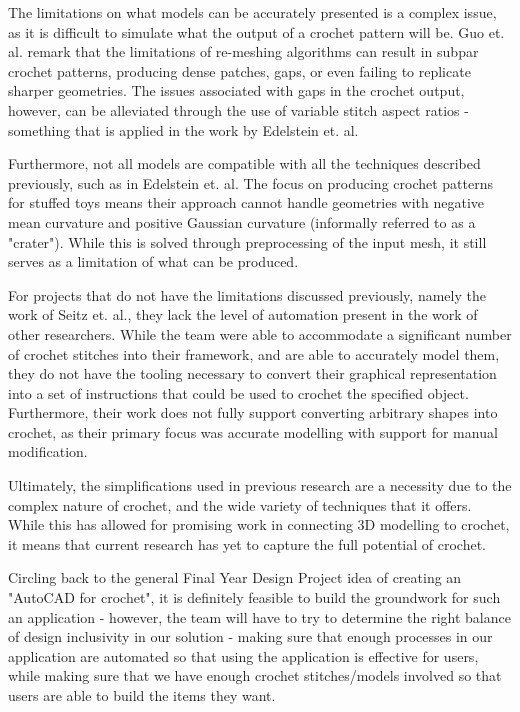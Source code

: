 \documentclass{IEEEcsmag}
\begin{document}
The limitations on what models can be accurately presented is a complex issue, as it is difficult to simulate what the output of a crochet pattern will be. Guo et. al. remark that the limitations of re-meshing algorithms can result in subpar crochet patterns, producing dense patches, gaps, or even failing to replicate sharper geometries. The issues associated with gaps in the crochet output, however, can be alleviated through the use of variable stitch aspect ratios - something that is applied in the work by Edelstein et. al. 

Furthermore, not all models are compatible with all the techniques described previously, such as in Edelstein et. al. The focus on producing crochet patterns for stuffed toys means their approach cannot handle geometries with negative mean curvature and positive Gaussian curvature (informally referred to as a "crater"). While this is solved through preprocessing of the input mesh, it still serves as a limitation of what can be produced. 

For projects that do not have the limitations discussed previously, namely the work of Seitz et. al., they lack the level of automation present in the work of other researchers. While the team were able to accommodate a significant number of crochet stitches into their framework, and are able to accurately model them, they do not have the tooling necessary to convert their graphical representation into a set of instructions that could be used to crochet the specified object. Furthermore, their work does not fully support converting arbitrary shapes into crochet, as their primary focus was accurate modelling with support for manual modification.

Ultimately, the simplifications used in previous research are a necessity due to the complex nature of crochet, and the wide variety of techniques that it offers. While this has allowed for promising work in connecting 3D modelling to crochet, it means that current research has yet to capture the full potential of crochet. 

Circling back to the general Final Year Design Project idea of creating an "AutoCAD for crochet", it is definitely feasible to build the groundwork for such an application - however, the team will have to try to determine the right balance of design inclusivity in our solution - making sure that enough processes in our application are automated so that using the application is effective for users, while making sure that we have enough crochet stitches/models involved so that users are able to build the items they want.
\end{document}
